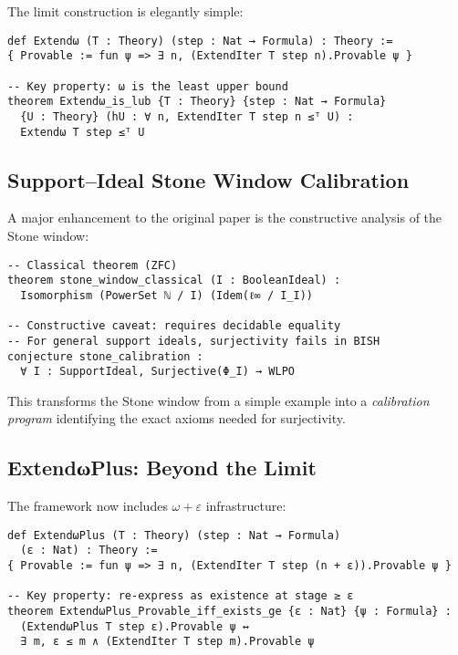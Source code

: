 \documentclass[11pt]{article}
\theoremstyle{definition}
\theoremstyle{remark}
\begin{document}
The limit construction is elegantly simple:

\begin{lstlisting}[language={}]
def Extendω (T : Theory) (step : Nat → Formula) : Theory :=
{ Provable := fun ψ => ∃ n, (ExtendIter T step n).Provable ψ }

-- Key property: ω is the least upper bound
theorem Extendω_is_lub {T : Theory} {step : Nat → Formula} 
  {U : Theory} (hU : ∀ n, ExtendIter T step n ≤ᵀ U) :
  Extendω T step ≤ᵀ U
\end{lstlisting}

\subsection{Support--Ideal Stone Window Calibration}

A major enhancement to the original paper is the constructive analysis of the Stone window:

\begin{lstlisting}[language={}]
-- Classical theorem (ZFC)
theorem stone_window_classical (I : BooleanIdeal) :
  Isomorphism (PowerSet ℕ / I) (Idem(ℓ∞ / I_I))

-- Constructive caveat: requires decidable equality
-- For general support ideals, surjectivity fails in BISH
conjecture stone_calibration :
  ∀ I : SupportIdeal, Surjective(Φ_I) → WLPO
\end{lstlisting}

This transforms the Stone window from a simple example into a \emph{calibration program} identifying the exact axioms needed for surjectivity.

\subsection{ExtendωPlus: Beyond the Limit}

The framework now includes $\omega+\varepsilon$ infrastructure:

\begin{lstlisting}[language={}]
def ExtendωPlus (T : Theory) (step : Nat → Formula) 
  (ε : Nat) : Theory :=
{ Provable := fun ψ => ∃ n, (ExtendIter T step (n + ε)).Provable ψ }

-- Key property: re-express as existence at stage ≥ ε
theorem ExtendωPlus_Provable_iff_exists_ge {ε : Nat} {ψ : Formula} :
  (ExtendωPlus T step ε).Provable ψ ↔ 
  ∃ m, ε ≤ m ∧ (ExtendIter T step m).Provable ψ
\end{lstlisting}
\end{document}
